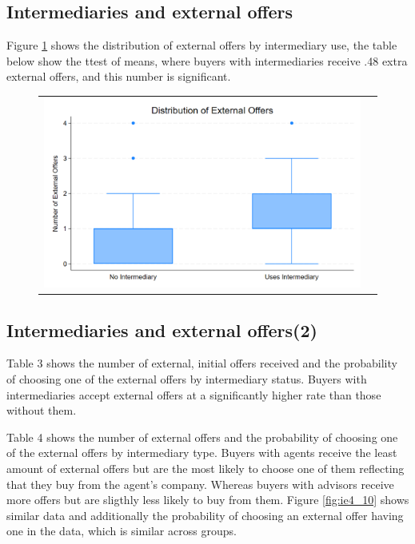 \documentclass[12pt]{article}
\begin{document}



\newpage

\subsection{Intermediaries and external offers}


Figure \ref{fig:ie4_7} shows the distribution of external offers by intermediary use, the table below show the ttest of means, where buyers with intermediaries receive .48 extra external offers, and this number is significant.  
\begin{figure}[H]
\caption{}
 \label{fig:ie4_7}
\centering{}%
\begin{tabular}{cc}
\includegraphics[scale=0.17]{../figures/IE4/IE4_intermediary_search_box.png} 
\end{tabular}
\end{figure}




 
\newpage

\subsection{Intermediaries and external offers(2)}

Table 3 shows the number of external, initial offers received and  the probability of choosing one of the external offers by intermediary status. Buyers with intermediaries accept external offers at a significantly higher rate than those without them. 

Table 4 shows the number of external offers and the probability of choosing one of the external offers by intermediary type. Buyers with agents receive the least amount of external offers but are the most likely to choose one of them reflecting that they buy from the agent's company. Whereas buyers with advisors receive more offers but are sligthly less likely to buy  from them. Figure \ref{fig:ie4_10} shows similar data and additionally the probability of choosing an external offer having one in the data, which is similar across groups. 
 
\end{document}
